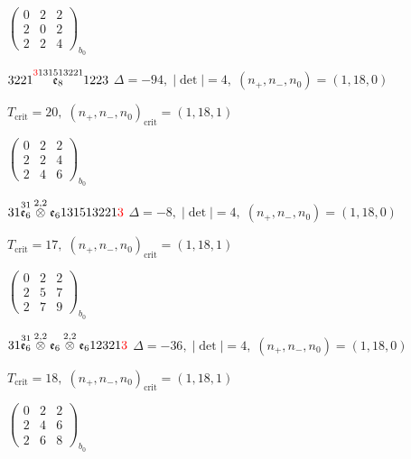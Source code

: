\documentclass[10pt]{article}
\begin{document}
\hspace{2em}$\left(\begin{smallmatrix}0 & 2 & 2 \\ 2 & 0 & 2 \\ 2 & 2 & 4\end{smallmatrix}\right)_{\!b_0}$

\smallskip

$3221\overset{\textcolor{red}{3}131513221}{\mathfrak{e}_8}1223$ \quad $\Delta=-94,\; |\det|=4,\; (n_+,n_-,n_0)=(1,18,0)$

\hspace{1em}$T_{\text{crit}}=20,\; (n_+,n_-,n_0)_{\text{crit}}=(1,18,1)$

\hspace{2em}$\left(\begin{smallmatrix}0 & 2 & 2 \\ 2 & 2 & 4 \\ 2 & 4 & 6\end{smallmatrix}\right)_{\!b_0}$

\smallskip

$31\overset{31}{\mathfrak{e}_6}\overset{2,2}{\otimes}\mathfrak{e}_6131513221\textcolor{red}{3}$ \quad $\Delta=-8,\; |\det|=4,\; (n_+,n_-,n_0)=(1,18,0)$

\hspace{1em}$T_{\text{crit}}=17,\; (n_+,n_-,n_0)_{\text{crit}}=(1,18,1)$

\hspace{2em}$\left(\begin{smallmatrix}0 & 2 & 2 \\ 2 & 5 & 7 \\ 2 & 7 & 9\end{smallmatrix}\right)_{\!b_0}$

\smallskip

$31\overset{31}{\mathfrak{e}_6}\overset{2,2}{\otimes}\mathfrak{e}_6\overset{2,2}{\otimes}\mathfrak{e}_612321\textcolor{red}{3}$ \quad $\Delta=-36,\; |\det|=4,\; (n_+,n_-,n_0)=(1,18,0)$

\hspace{1em}$T_{\text{crit}}=18,\; (n_+,n_-,n_0)_{\text{crit}}=(1,18,1)$

\hspace{2em}$\left(\begin{smallmatrix}0 & 2 & 2 \\ 2 & 4 & 6 \\ 2 & 6 & 8\end{smallmatrix}\right)_{\!b_0}$
\end{document}
